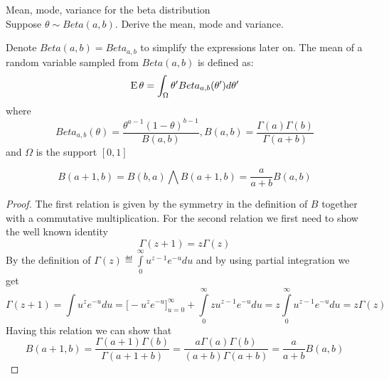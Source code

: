 \documentclass[a4paper,twoside=false,abstract=false,numbers=noenddot,
titlepage=false,headings=small,parskip=half,version=last]{scrartcl}
\begin{document}

\begin{exercise}{2.16} Mean, mode, variance for the beta distribution \\
    Suppose $\theta \sim Beta(a,b)$. Derive the mean, mode and variance.
\end{exercise}
\begin{solution}
    Denote $Beta(a,b)=Beta_{a,b}$ to simplify the expressions later on. The
    mean of a random variable sampled from $Beta(a,b)$ is defined as:
    \begin{equation}
        {\rm E}\,\theta = \int_\Omega\theta'Beta_{a,b}(\theta')d\theta'
    \end{equation}
    where 
    \begin{equation}
        Beta_{a,b}(\theta)=\frac{\theta^{a-1}(1-\theta)^{b-1}}{B(a,b)},
        B(a,b)=\frac{\Gamma(a)\Gamma(b)}{\Gamma(a+b)}
    \end{equation}
    and $\Omega$ is the support $[0,1]$
    \begin{lemma}\label{lem:Bplus1}
        \begin{equation}
            B(a+1,b)=B(b,a) \bigwedge B(a+1,b)=\frac{a}{a+b}B(a,b)
        \end{equation}
    \end{lemma}
    \begin{proof}
        The first relation is given by the symmetry in the definition of $B$
        together with a commutative multiplication.
        For the second relation we first need to show the well known identity
        \begin{equation}
            \Gamma(z+1)=z\Gamma(z)
        \end{equation}
        By the definition of $\Gamma(z) \eqdef
        \int\limits_0^\infty{u^{z-1}e^{-u}du}$
        and by using partial integration we get
        \begin{equation}
            \Gamma(z+1)=\int{u^ze^{-u}du}=\big[-u^ze^{-u}\big]_{u=0}^\infty+
            \int\limits_0^\infty{zu^{z-1}e^{-u}du}=z\int\limits_0^\infty{u^{z-1}e^{-u}du}=z\Gamma(z)
        \end{equation}
        Having this relation we can show that
        \begin{equation}
            B(a+1,b)=\frac{\Gamma(a+1)\Gamma(b)}{\Gamma(a+1+b)}=
            \frac{a\Gamma(a)\Gamma(b)}{(a+b)\Gamma(a+b)}=\frac{a}{a+b}B(a,b)
        \end{equation}
    \end{proof}
    

\end{solution}
\end{document}

